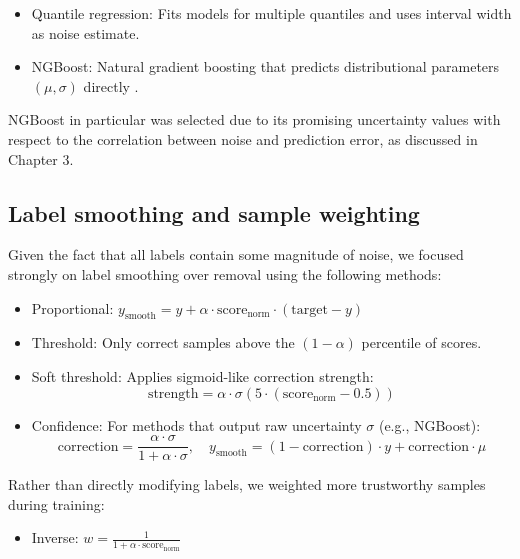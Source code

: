 {\begin{itemize}
    \item Quantile regression: Fits models for multiple quantiles and uses interval width as noise estimate.
    
    \item NGBoost: Natural gradient boosting that predicts distributional parameters $(\mu, \sigma)$ directly \citep{Duan2020}.
\end{itemize}

NGBoost in particular was selected due to its promising uncertainty values with respect to the correlation between noise and prediction error, as discussed in Chapter 3.  

\subsection{Label smoothing and sample weighting}

Given the fact that all labels contain some magnitude of noise, we focused strongly on label smoothing over removal using the following methods:

\begin{itemize}
    \item Proportional: $y_{\text{smooth}} = y + \alpha \cdot \text{score}_{\text{norm}} \cdot (\text{target} - y)$
    
    \item Threshold: Only correct samples above the $(1-\alpha)$ percentile of scores.
    
    \item Soft threshold: Applies sigmoid-like correction strength:
    $$\text{strength} = \alpha \cdot \sigma\left(5 \cdot (\text{score}_{\text{norm}} - 0.5)\right)$$
    
    \item Confidence: For methods that output raw uncertainty $\sigma$ (e.g., NGBoost):
    $$\text{correction} = \frac{\alpha \cdot \sigma}{1 + \alpha \cdot \sigma}, \quad y_{\text{smooth}} = (1 - \text{correction}) \cdot y + \text{correction} \cdot \mu$$
\end{itemize}


Rather than directly modifying labels, we weighted more trustworthy samples during training:

\begin{itemize}
    \item Inverse: $w = \frac{1}{1 + \alpha \cdot \text{score}_{\text{norm}}}$
    

\end{itemize}}
